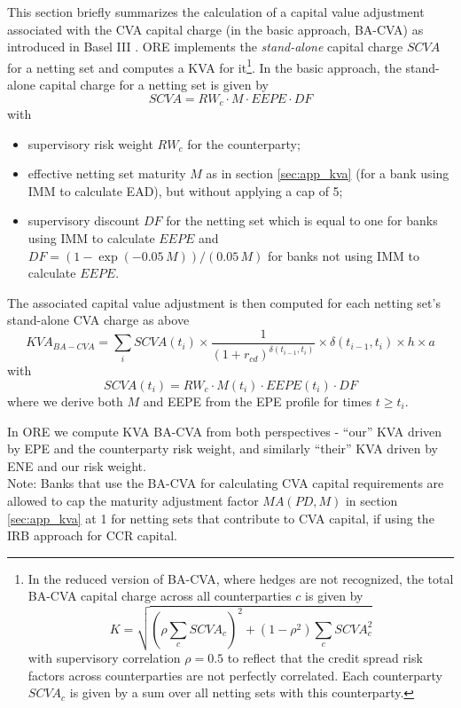 \documentclass[12pt, a4paper]{article}
\newcommand{\CVA}{\mathit{CVA}}
\newcommand{\KVA}{\mathit{KVA}}
\newcommand{\EEPE}{\mathit{EEPE}}
\newcommand{\RW}{\mathit{RW}}
\newcommand{\PD}{\mathit{PD}}
\newcommand{\DF}{\mathit{DF}}
\newcommand{\MA}{\mathit{MA}}
\newcommand{\SCVA}{\mathit{SCVA}}
\begin{document}
{\begin{appendix}
This section briefly summarizes the calculation of a capital value adjustment associated with the CVA capital charge (in the basic approach, BA-CVA) as introduced in Basel III \cite{bcbs189, d325, d424}. ORE implements the {\em stand-alone} capital charge $\SCVA$ for a netting set and computes a KVA for it\footnote{In the reduced version of BA-CVA, where hedges are not recognized, the total BA-CVA capital charge across all counterparties $c$ is given by
$$
K = \sqrt{\left(\rho \sum_c \SCVA_c\right)^2 +(1-\rho^2)\sum_c \SCVA_c^2}
$$  
with supervisory correlation $\rho=0.5$ to reflect that the credit spread risk factors across counterparties are not perfectly correlated. Each counterparty $\SCVA_c$ is given by a sum over all netting sets with this counterparty.}. In the basic approach, the stand-alone capital charge for a netting set is given by
$$
\SCVA = \RW_c\cdot M\cdot \EEPE \cdot\DF
$$
with 
\begin{itemize}
\item supervisory risk weight $\RW_c$ for the counterparty;
\item effective netting set maturity $M$ as in section \ref{sec:app_kva} (for a bank using IMM to calculate EAD), but without applying a cap of 5;
\item supervisory discount $\DF$ for the netting set which is equal to one for banks using IMM to calculate $\EEPE$ and $\DF=\left(1-\exp\left(-0.05\,M\right)\right)/(0.05\,M)$ for banks not using IMM to calculate $\EEPE$. 
\end{itemize}

The associated capital value adjustment is then computed for each netting set's stand-alone CVA charge as above
$$
\KVA_{BA-\CVA} = \sum_i \SCVA(t_i) \times \frac{1}{ (1 + r_{cd})^{\delta(t_{i-1}, t_i)}} \times \delta(t_{i-1}, t_i) \times h \times a
$$
with 
$$
\SCVA(t_i) = \RW_c \cdot M(t_i)\cdot \EEPE(t_i)\cdot\DF
$$
where we derive both $M$ and EEPE from the EPE profile for times $t\geq t_i$.

In ORE we compute KVA BA-CVA from both perspectives - ``our'' KVA driven by EPE and the counterparty risk weight, and similarly ``their'' KVA driven by ENE and our risk weight. \\

Note: Banks that use the BA-CVA for calculating CVA capital requirements are allowed to cap the maturity adjustment factor $\MA(\PD,M)$ in section \ref{sec:app_kva} at 1 for netting sets that contribute to CVA capital, if using the IRB approach for CCR capital.


\end{appendix}}
\end{document}
